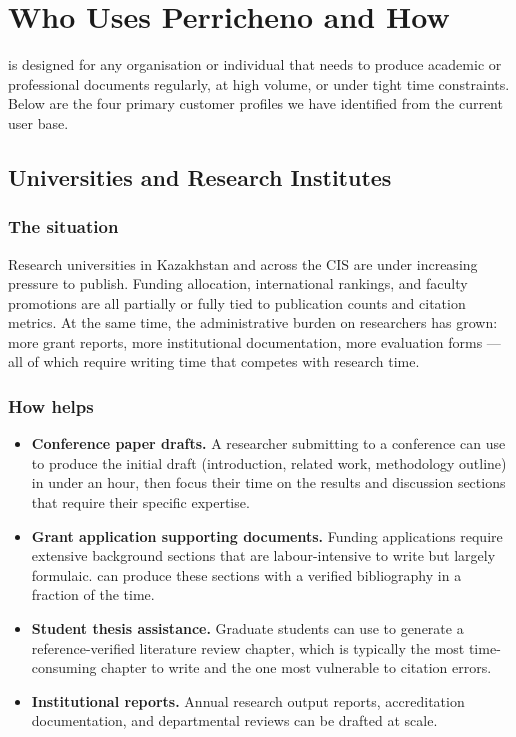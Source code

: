 \section{Who Uses Perricheno and How}
\label{sec:use_cases}

\sys{} is designed for any organisation or individual that needs to produce academic
or professional documents regularly, at high volume, or under tight time constraints.
Below are the four primary customer profiles we have identified from the current
user base.

\subsection{Universities and Research Institutes}

\subsubsection*{The situation}

Research universities in Kazakhstan and across the CIS are under increasing pressure
to publish.
Funding allocation, international rankings, and faculty promotions are all
partially or fully tied to publication counts and citation metrics.
At the same time, the administrative burden on researchers has grown: more grant
reports, more institutional documentation, more evaluation forms — all of which
require writing time that competes with research time.

\subsubsection*{How \sys{} helps}

\begin{itemize}
  \item \textbf{Conference paper drafts.}
        A researcher submitting to a conference can use \sys{} to produce the
        initial draft (introduction, related work, methodology outline) in under
        an hour, then focus their time on the results and discussion sections
        that require their specific expertise.
  \item \textbf{Grant application supporting documents.}
        Funding applications require extensive background sections that are
        labour-intensive to write but largely formulaic.
        \sys{} can produce these sections with a verified bibliography in
        a fraction of the time.
  \item \textbf{Student thesis assistance.}
        Graduate students can use \sys{} to generate a reference-verified
        literature review chapter, which is typically the most time-consuming
        chapter to write and the one most vulnerable to citation errors.
  \item \textbf{Institutional reports.}
        Annual research output reports, accreditation documentation, and
        departmental reviews can be drafted at scale.
\end{itemize}

